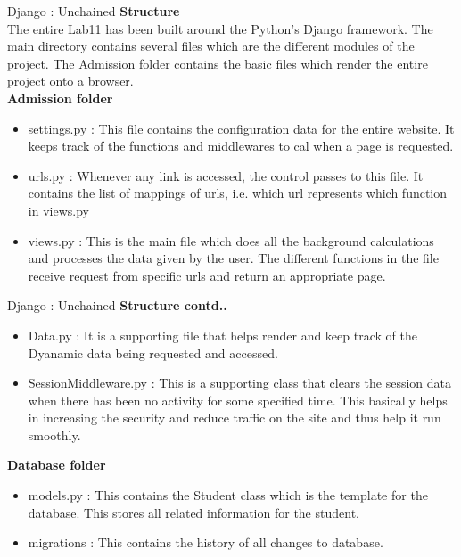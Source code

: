 \documentclass{beamer}
\begin{document}
\begin{frame}[t]{Django : Unchained}
\textbf{Structure}\\
\pause
The entire Lab11 has been built around the Python's Django framework. The main directory contains several files which are the different modules of the project. The Admission folder contains the basic files which render the entire project onto a browser.\\
\pause
\textbf {Admission folder}
\begin{itemize}[<+->]
\item settings.py : This file contains the configuration data for the entire website. It keeps track of the functions and middlewares to cal when a page is requested.
\item urls.py : Whenever any link is accessed, the control passes to this file. It contains the list of mappings of urls, i.e. which url represents which function in views.py
\item views.py : This is the main file which does all the background calculations and processes the data given by the user. The different functions in the file receive request from specific urls and return an appropriate page.
\end{itemize}
\end{frame}

\begin{frame}[t]{Django : Unchained}
\textbf{Structure contd..}\\
\begin{itemize}[<+->]
\item Data.py : It is a supporting file that helps render and keep track of the Dyanamic data being requested and accessed.
\item SessionMiddleware.py : This is a supporting class that clears the session data when there has been no activity for some specified time. This basically helps in increasing the security and reduce traffic on the site and thus help it run smoothly.
\end{itemize}

\textbf{Database folder}
\begin{itemize}[<+->]
\item models.py : This contains the Student class which is the template for the database. This stores all related information for the student.
\item migrations : This contains the history of all changes to database.
\end{itemize}
\end{frame}
\end{document}
